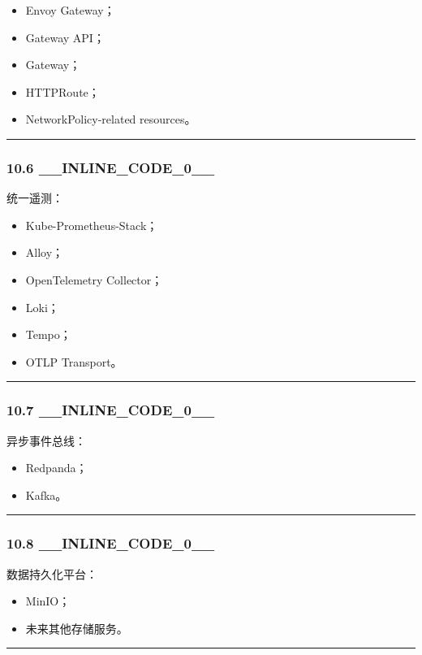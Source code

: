 \documentclass[11pt,a4paper]{article}
\begin{document}
\begin{itemize}
  \item Envoy Gateway；
  \item Gateway API；
  \item Gateway；
  \item HTTPRoute；
  \item NetworkPolicy-related resources。
\end{itemize}
\vspace{0.5em}\hrule\vspace{0.5em}
\subsubsection{10.6 \_\_INLINE\_CODE\_0\_\_}
统一遥测：

\begin{itemize}
  \item Kube-Prometheus-Stack；
  \item Alloy；
  \item OpenTelemetry Collector；
  \item Loki；
  \item Tempo；
  \item OTLP Transport。
\end{itemize}
\vspace{0.5em}\hrule\vspace{0.5em}
\subsubsection{10.7 \_\_INLINE\_CODE\_0\_\_}
异步事件总线：

\begin{itemize}
  \item Redpanda；
  \item Kafka。
\end{itemize}
\vspace{0.5em}\hrule\vspace{0.5em}
\subsubsection{10.8 \_\_INLINE\_CODE\_0\_\_}
数据持久化平台：

\begin{itemize}
  \item MinIO；
  \item 未来其他存储服务。
\end{itemize}
\vspace{0.5em}\hrule\vspace{0.5em}
\end{document}
